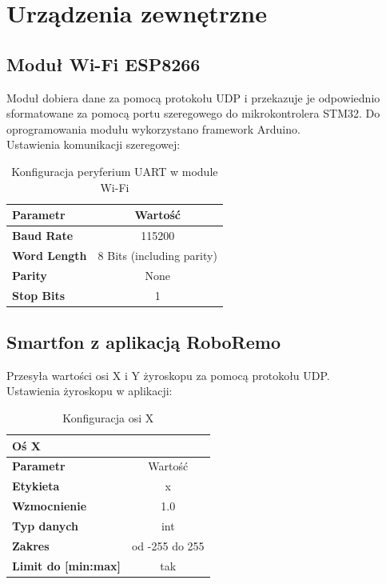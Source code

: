 \documentclass[10pt, a4paper]{article}
\begin{document}
\section{Urządzenia zewnętrzne}
	\subsection{Moduł Wi-Fi ESP8266}
	Moduł dobiera dane za pomocą protokołu UDP i przekazuje je odpowiednio sformatowane za pomocą portu szeregowego do mikrokontrolera STM32. Do oprogramowania modułu wykorzystano framework Arduino. \\
	Ustawienia komunikacji szeregowej:
		\begin{table}[H]
			\centering
			\begin{tabular}{|l|c|} \hline
				\textbf{Parametr} & Wartość \\
				\hline
				\hline  \textbf{Baud Rate}&115200  \\\hline
				\textbf{Word Length } & 8 Bits (including parity)\\\hline
				\textbf{Parity} &  None\\
				\hline
				\textbf{Stop Bits}& 1\\
				\hline
			\end{tabular}
			\caption{Konfiguracja peryferium UART w module Wi-Fi}
			\label{tab:UARTWiFI}
		\end{table}
	
	\subsection{Smartfon z aplikacją RoboRemo}
	Przesyła wartości osi X i Y żyroskopu za pomocą protokołu UDP. \\ 
	Ustawienia żyroskopu w aplikacji:
	\begin{table}[H]
		\centering
		\begin{tabular}{|l|c|} 
			\hline
			\textbf{Oś X} & \\
			\hline
			\textbf{Parametr} & Wartość \\
			\hline
			\hline  \textbf{Etykieta}&x  \\\hline
			 \textbf{Wzmocnienie}&1.0  \\\hline
			\textbf{Typ danych} & int\\\hline
			\textbf{Zakres} &  od -255 do 255\\
			\hline
			\textbf{Limit do [min:max]}& tak\\
			\hline
		\end{tabular}
		\caption{Konfiguracja osi X}
		\label{tab:OsX}
	\end{table}
\end{document}
